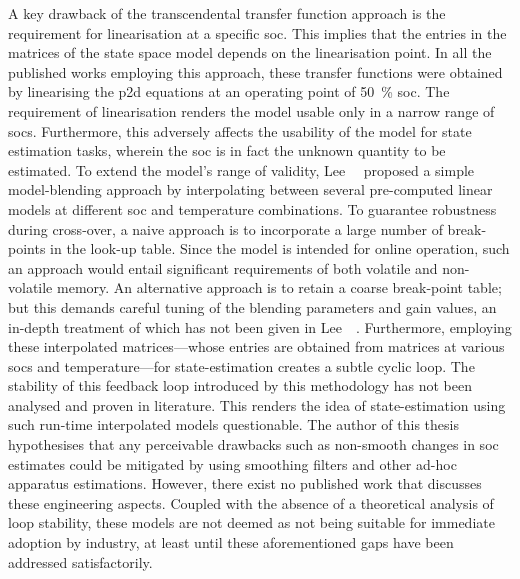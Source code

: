 A  key  drawback  of  the  transcendental  transfer  function  approach  is  the
requirement for  linearisation at  a specific \gls{soc}.  This implies  that the
entries in  the matrices of the  state space model depends  on the linearisation
point.  In all  the  published  works employing  this  approach, these  transfer
functions were obtained  by linearising the \gls{p2d} equations  at an operating
point of  \SI{50}{\percent} \gls{soc}. The requirement  of linearisation renders
the  model usable  only  in  a narrow  range  of  \gls{soc}s. Furthermore,  this
adversely affects the usability of the model for state estimation tasks, wherein
the  \gls{soc} is  in  fact the  unknown  quantity to  be  estimated. To  extend
the  model's range  of  validity, Lee~\etal{}~\cite{Lee2014}  proposed a  simple
model-blending  approach by  interpolating between  several pre-computed  linear
models  at  different  \gls{soc}  and  temperature  combinations.  To  guarantee
robustness during cross-over, a naive approach  is to incorporate a large number
of break-points  in the look-up  table. Since the  model is intended  for online
operation,  such  an approach  would  entail  significant requirements  of  both
volatile  and  non-volatile memory.  An  alternative  approach  is to  retain  a
coarse  break-point table;  but  this  demands careful  tuning  of the  blending
parameters  and  gain values,  an  in-depth  treatment  of  which has  not  been
given  in  Lee~\etal~\cite{Lee2014}.  Furthermore, employing  these  interpolated
matrices---whose entries  are obtained from  matrices at various  \gls{soc}s and
temperature---for state-estimation  creates a subtle cyclic  loop. The stability
of  this feedback  loop introduced  by this  methodology has  not been  analysed
and  proven in  literature.  This  renders the  idea  of state-estimation  using
such  run-time  interpolated models  questionable.  The  author of  this  thesis
hypothesises  that  any perceivable  drawbacks  such  as non-smooth  changes  in
\gls{soc}  estimates could  be mitigated  by using  smoothing filters  and other
ad-hoc  apparatus  estimations. However,  there  exist  no published  work  that
discusses these engineering  aspects. Coupled with the absence  of a theoretical
analysis of  loop stability, these models  are not deemed as  not being suitable
for immediate  adoption by  industry, at least  until these  aforementioned gaps
have been addressed satisfactorily.

